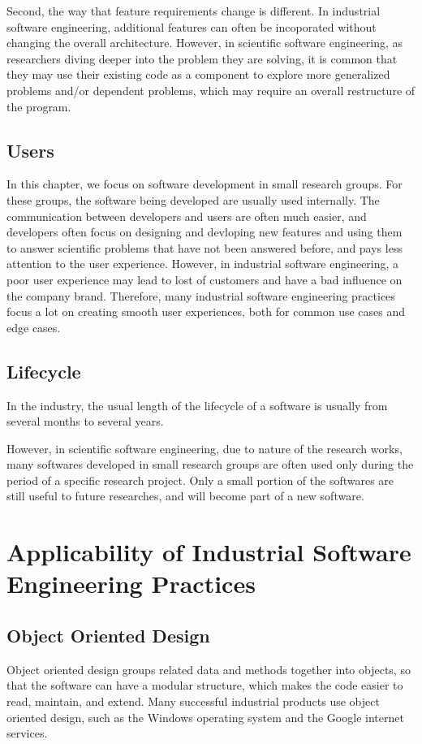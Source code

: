 Second, the way that feature requirements change is different.
In industrial software engineering, additional features can often be incoporated without changing the overall architecture.
However, in scientific software engineering, as researchers diving deeper into the problem they are solving, it is common that they may use their existing code as a component to explore more generalized problems and/or dependent problems, which may require an overall restructure of the program.

\subsection{Users}
In this chapter, we focus on software development in small research groups.
For these groups, the software being developed are usually used internally.
The communication between developers and users are often much easier, and developers often focus on designing and devloping new features and using them to answer scientific problems that have not been answered before, and pays less attention to the user experience.
However, in industrial software engineering, a poor user experience may lead to lost of customers and have a bad influence on the company brand.
Therefore, many industrial software engineering practices focus a lot on creating smooth user experiences, both for common use cases and edge cases.

\subsection{Lifecycle}

In the industry, the usual length of the lifecycle of a software is usually from several months to several years.

However, in scientific software engineering, due to nature of the research works, many softwares developed in small research groups are often used only during the period of a specific research project.
Only a small portion of the softwares are still useful to future researches, and will become part of a new software.

\section{Applicability of Industrial Software Engineering Practices}

\subsection{Object Oriented Design}
Object oriented design groups related data and methods together into objects, so that the software can have a modular structure, which makes the code easier to read, maintain, and extend.
Many successful industrial products use object oriented design, such as the Windows operating system and the Google internet services.

